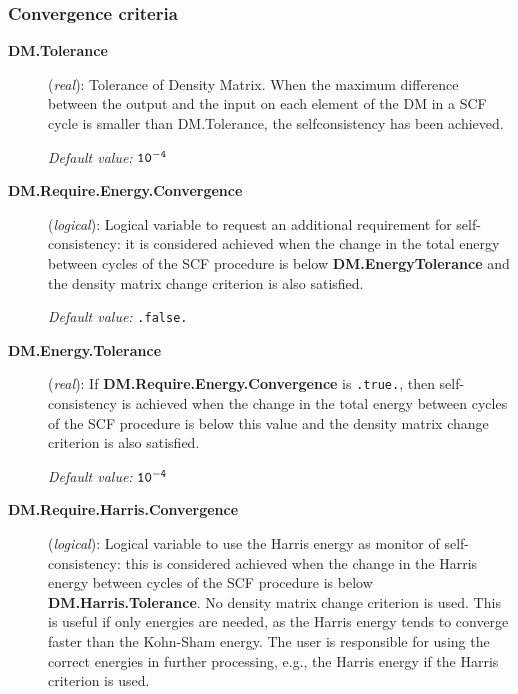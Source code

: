 \documentclass[11pt]{article}
\begin{document}
\subsubsection{Convergence criteria}

\begin{description}
\item[{\bf DM.Tolerance}] ({\it real}):
Tolerance of Density Matrix.
When the maximum difference between the output and the
input on each element of the DM
in a SCF cycle is smaller than DM.Tolerance,
the selfconsistency has been achieved.

{\it Default value:} {${\tt 10^{-4}}$}



\item[{\bf DM.Require.Energy.Convergence}] ({\it logical}):
Logical variable to request an additional requirement for
self-consistency: it is considered achieved when the change in the total energy between cycles
of the SCF procedure is below {\bf DM.EnergyTolerance} and the
density matrix change criterion is also satisfied.

{\it Default value:} {\tt .false.}

\item[{\bf DM.Energy.Tolerance}] ({\it real}):
If {\bf DM.Require.Energy.Convergence} is {\tt .true.}, then
self-consistency is achieved when the change in the total energy between cycles
of the SCF procedure is below this value and the
density matrix change criterion is also satisfied.

{\it Default value:} {${\tt 10^{-4}}$}

\item[{\bf DM.Require.Harris.Convergence}] ({\it logical}):
Logical variable to use the Harris energy as monitor of
self-consistency: this is considered achieved when the change in the Harris energy between cycles
of the SCF procedure is below {\bf DM.Harris.Tolerance}. No density
matrix change criterion is used.
This is useful if only energies are needed, as the Harris energy tends
to converge faster than the Kohn-Sham energy.
The user is responsible for using the correct energies in further
processing, e.g., the Harris energy if the Harris criterion is used.


\end{description}
\end{document}

